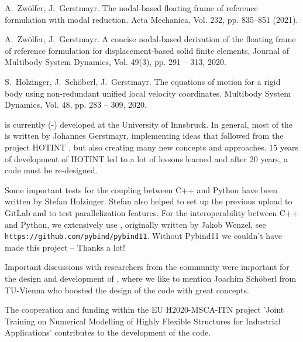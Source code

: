   \item A.\ Zw{\"o}lfer, J.\ Gerstmayr. The nodal-based floating frame of reference formulation with modal reduction. Acta Mechanica, Vol. 232, pp.  835--851 (2021). 
  \item A.\ Zw{\"o}lfer, J.\ Gerstmayr. A concise nodal-based derivation of the floating frame of reference formulation for displacement-based solid finite elements, Journal of Multibody System Dynamics, Vol. 49(3), pp. 291 -- 313, 2020. 
  \item S.\ Holzinger, J.\ Sch{\"o}berl, J.\ Gerstmayr. The equations of motion for a rigid body using non-redundant unified local velocity coordinates. Multibody System Dynamics, Vol. 48, pp. 283 -- 309, 2020. 
\ei

\codeName is currently (\the\month-\the\year) developed at the University of Innsbruck.
In general, most of the \codeName is written by Johannes Gerstmayr, implementing ideas that followed from the project HOTINT \cite{GerstmayrEtAl2013}, but also creating many new concepts and approaches. 15 years of development of HOTINT led to a lot of lessons learned and after 20 years, a code must be re-designed.

Some important tests for the coupling between C++ and Python have been written by Stefan Holzinger. Stefan also helped to set up the previous upload to GitLab and to test parallelization features.
For the interoperability between C++ and Python, we extensively use \cite{pybind11}, originally written by Jakob Wenzel, see \texttt{https://github.com/pybind/pybind11}. Without Pybind11 we couldn't have made this project -- Thanks a lot!

Important discussions with researchers from the community were important for the design and development of \codeName , where we like to mention Joachim Sch{\"o}berl from TU-Vienna who boosted the design of the code with great concepts. 

The cooperation and funding within the EU H2020-MSCA-ITN project 'Joint Training on Numerical Modelling of Highly Flexible Structures for Industrial Applications' contributes to the development of the code.


